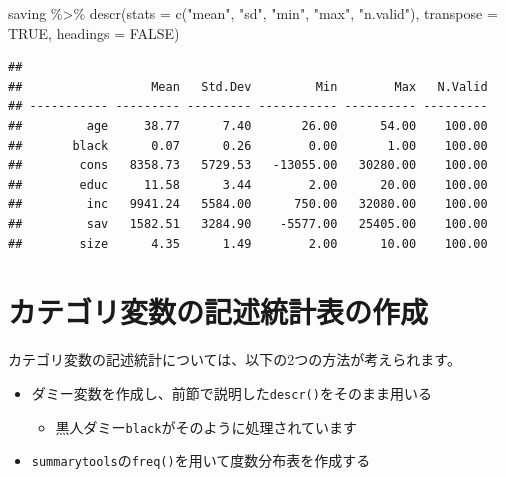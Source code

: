 \documentclass[
]{book}
\newenvironment{Shaded}{\begin{snugshade}}{\end{snugshade}}
\newcommand{\AttributeTok}[1]{\textcolor[rgb]{0.77,0.63,0.00}{#1}}
\newcommand{\ConstantTok}[1]{\textcolor[rgb]{0.00,0.00,0.00}{#1}}
\newcommand{\FunctionTok}[1]{\textcolor[rgb]{0.00,0.00,0.00}{#1}}
\newcommand{\NormalTok}[1]{#1}
\newcommand{\SpecialCharTok}[1]{\textcolor[rgb]{0.00,0.00,0.00}{#1}}
\newcommand{\StringTok}[1]{\textcolor[rgb]{0.31,0.60,0.02}{#1}}
\providecommand{\tightlist}{%
  \setlength{\itemsep}{0pt}\setlength{\parskip}{0pt}}
\begin{document}
\begin{Shaded}
\begin{Highlighting}[]
\NormalTok{saving }\SpecialCharTok{\%\textgreater{}\%} 
  \FunctionTok{descr}\NormalTok{(}\AttributeTok{stats =} \FunctionTok{c}\NormalTok{(}\StringTok{"mean"}\NormalTok{, }\StringTok{"sd"}\NormalTok{, }\StringTok{"min"}\NormalTok{, }\StringTok{"max"}\NormalTok{, }\StringTok{"n.valid"}\NormalTok{), }\AttributeTok{transpose =} \ConstantTok{TRUE}\NormalTok{, }\AttributeTok{headings =} \ConstantTok{FALSE}\NormalTok{)}
\end{Highlighting}
\end{Shaded}

\begin{verbatim}
## 
##                  Mean   Std.Dev         Min        Max   N.Valid
## ----------- --------- --------- ----------- ---------- ---------
##         age     38.77      7.40       26.00      54.00    100.00
##       black      0.07      0.26        0.00       1.00    100.00
##        cons   8358.73   5729.53   -13055.00   30280.00    100.00
##        educ     11.58      3.44        2.00      20.00    100.00
##         inc   9941.24   5584.00      750.00   32080.00    100.00
##         sav   1582.51   3284.90    -5577.00   25405.00    100.00
##        size      4.35      1.49        2.00      10.00    100.00
\end{verbatim}

\hypertarget{ux30abux30c6ux30b4ux30eaux5909ux6570ux306eux8a18ux8ff0ux7d71ux8a08ux8868ux306eux4f5cux6210}{%
\section{カテゴリ変数の記述統計表の作成}\label{ux30abux30c6ux30b4ux30eaux5909ux6570ux306eux8a18ux8ff0ux7d71ux8a08ux8868ux306eux4f5cux6210}}

カテゴリ変数の記述統計については、以下の2つの方法が考えられます。

\begin{itemize}
\tightlist
\item
  ダミー変数を作成し、前節で説明した\texttt{descr()}をそのまま用いる

  \begin{itemize}
  \tightlist
  \item
    黒人ダミー\texttt{black}がそのように処理されています
  \end{itemize}
\item
  \texttt{summarytools}の\texttt{freq()}を用いて度数分布表を作成する
\end{itemize}
\end{document}

